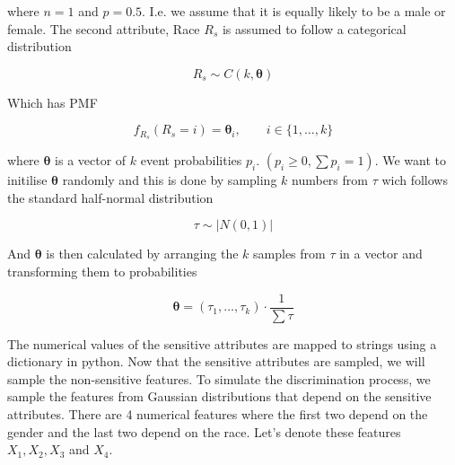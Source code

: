 where $n = 1$ and $p = 0.5$. I.e. we assume that it is equally likely to be a male or female. The second attribute, Race $R_s$ is assumed to follow a categorical distribution 

\begin{equation*}
    R_s \sim C(k, \boldsymbol{\theta})
\end{equation*}

Which has PMF

\begin{equation*}
    f_{R_s}(R_s = i) = \boldsymbol{\theta}_i, \qquad i \in \{ 1, \dots, k\}
\end{equation*}

where $\boldsymbol{\theta}$ is a vector of $k$ event probabilities $p_i$. $(p_i \geq 0, \sum p_i = 1)$. We want to initilise $\boldsymbol{\theta}$ randomly and this is done by sampling $k$ numbers from $\tau$ wich follows the standard half-normal distribution

\begin{equation*}
    \tau \sim |N(0, 1)|
\end{equation*}

And $\boldsymbol{\theta}$ is then calculated by arranging the $k$ samples from $\tau$ in a vector and transforming them to probabilities 

\begin{equation*}
    \boldsymbol{\theta} = ({\tau_1, \dots, \tau_k}) \cdot \frac{1}{\sum \tau}
\end{equation*}

The numerical values of the sensitive attributes are mapped to strings using a dictionary in python. Now that the sensitive attributes are sampled, we will sample the non-sensitive features. To simulate the discrimination process, we sample the features from Gaussian distributions that depend on the sensitive attributes. There are 4 numerical features where the first two depend on the gender and the last two depend on the race. Let's denote these features $X_1, X_2, X_3$ and $X_4$.

